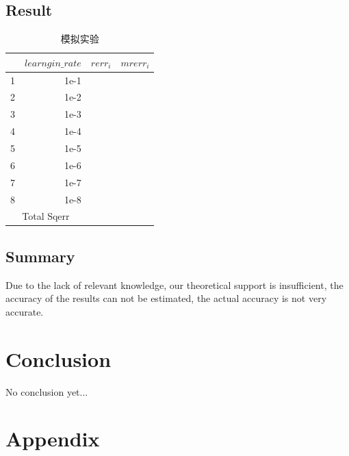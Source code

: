 \documentclass[conference,compsoc]{appendix/report}
\begin{document}
\subsection{Result}
\begin{table}[h]  %
\centering  %
\caption{模拟实验}  %
 \begin{tabular}{rrrr}  %
     \hline
     \hline
       & $learngin\_rate$ & ${rerr}_{i}$ & ${mrerr}_{i}$ \\ [0.5ex]  %
       \hline
       1 & 1e-1 &   &   \\
       2 & 1e-2 &   &   \\
       3 & 1e-3 &   &   \\
       4 & 1e-4 &   &   \\
       5 & 1e-5 &   &   \\
       6 & 1e-6 &   &   \\
       7 & 1e-7 &   &   \\
       8 & 1e-8 &   &   \\
       \hline
       \multicolumn{2}{c}{Total Sqerr} &   &   \\  %
       \hline
       \hline
   \end{tabular}
\end{table}

\subsection{Summary}
Due to the lack of relevant knowledge, our theoretical support is insufficient, the accuracy of the results can not be estimated, the actual accuracy is not very accurate.


\section{Conclusion}
No conclusion yet...


\section{Appendix}
\end{document}
